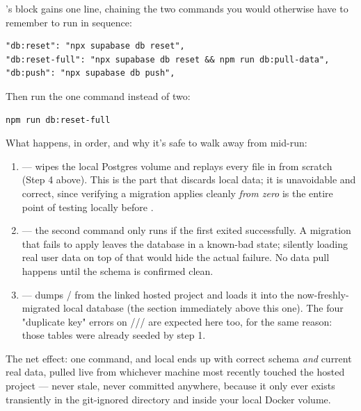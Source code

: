 \begin{olkhowto}
's  block gains one line, chaining the two commands you would otherwise have to remember to run in sequence:
\begin{lstlisting}[caption={package.json — the new script, alongside the two it reuses}]
"db:reset": "npx supabase db reset",
"db:reset-full": "npx supabase db reset && npm run db:pull-data",
"db:push": "npx supabase db push",
\end{lstlisting}
Then run the one command instead of two:
\begin{lstlisting}[style=olkcodebash, caption={The whole daily-safe reset, start to finish}]
npm run db:reset-full
\end{lstlisting}
What happens, in order, and why it's safe to walk away from mid-run:
\begin{enumerate}
  \item \textbf{} — wipes the local Postgres volume and replays every file in  from scratch (Step 4 above). This is the part that discards local data; it is unavoidable and correct, since verifying a migration applies cleanly \emph{from zero} is the entire point of testing locally before .
  \item \code{\&\&} — the second command only runs if the first exited successfully. A migration that fails to apply leaves the database in a known-bad state; silently loading real user data on top of that would hide the actual failure. No data pull happens until the schema is confirmed clean.
  \item \textbf{} — dumps / from the linked hosted project and loads it into the now-freshly-migrated local database (the section immediately above this one). The four "duplicate key" errors on /// are expected here too, for the same reason: those tables were already seeded by step 1.
\end{enumerate}
The net effect: one command, and local ends up with correct schema \emph{and} current real data, pulled live from whichever machine most recently touched the hosted project — never stale, never committed anywhere, because it only ever exists transiently in the git-ignored  directory and inside your local Docker volume.
\end{olkhowto}

